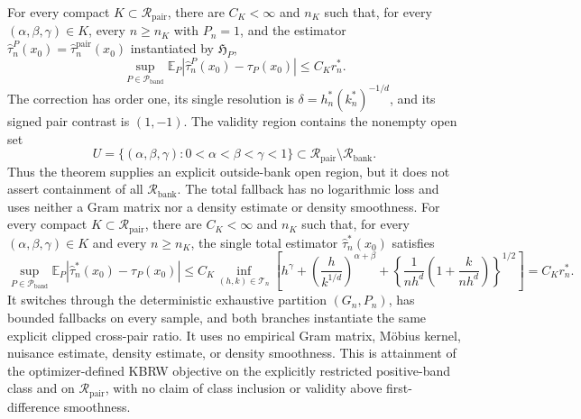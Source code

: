 For every compact \(K\subset\mathcal R_{\mathrm{pair}}\), there are \(C_K<\infty\) and \(n_K\) such that, for every \((\alpha,\beta,\gamma)\in K\), every \(n\geq n_K\) with \(P_n=1\), and the estimator \(\widehat\tau_n^P(x_0)=\widehat\tau_n^{\mathrm{pair}}(x_0)\) instantiated by \(\mathfrak H_P\),
\[
 \sup_{P\in\mathcal P_{\mathrm{band}}}
 \mathbb E_P\left|\widehat\tau_n^P(x_0)-\tau_P(x_0)\right|\leq C_Kr_n^*.
\]
The correction has order one, its single resolution is \(\delta=h_n^*(k_n^*)^{-1/d}\), and its signed pair contrast is \((1,-1)\).  The validity region contains the nonempty open set
\[
 U=\{(\alpha,\beta,\gamma):0<\alpha<\beta<\gamma<1\}
 \subset\mathcal R_{\mathrm{pair}}\setminus\mathcal R_{\mathrm{bank}}.
\]
Thus the theorem supplies an explicit outside-bank open region, but it does not assert containment of all \(\mathcal R_{\mathrm{bank}}\).  The total fallback has no logarithmic loss and uses neither a Gram matrix nor a density estimate or density smoothness.
For every compact \(K\subset\mathcal R_{\mathrm{pair}}\), there are \(C_K<\infty\) and \(n_K\) such that, for every \((\alpha,\beta,\gamma)\in K\) and every \(n\geq n_K\), the single total estimator \(\widehat\tau_n^*(x_0)\) satisfies
\[
 \sup_{P\in\mathcal P_{\mathrm{band}}}\mathbb E_P\left|\widehat\tau_n^*(x_0)-\tau_P(x_0)\right|
 \leq C_K\inf_{(h,k)\in\mathcal T_n}\left[h^\gamma+
 \left(\frac{h}{k^{1/d}}\right)^{\alpha+\beta}+
 \left\{\frac1{nh^d}\left(1+\frac{k}{nh^d}\right)\right\}^{1/2}\right]
 =C_Kr_n^*.
\]
It switches through the deterministic exhaustive partition \((G_n,P_n)\), has bounded fallbacks on every sample, and both branches instantiate the same explicit clipped cross-pair ratio.  It uses no empirical Gram matrix, M\"obius kernel, nuisance estimate, density estimate, or density smoothness.  This is attainment of the optimizer-defined KBRW objective on the explicitly restricted positive-band class and on \(\mathcal R_{\mathrm{pair}}\), with no claim of class inclusion or validity above first-difference smoothness.

